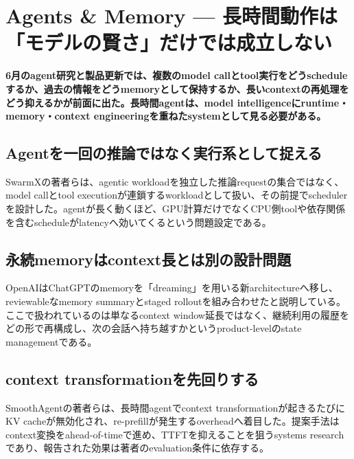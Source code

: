 \section{Agents \& Memory — 長時間動作は「モデルの賢さ」だけでは成立しない}
\noindent\textbf{6月のagent研究と製品更新では、複数のmodel callとtool実行をどうscheduleするか、過去の情報をどうmemoryとして保持するか、長いcontextの再処理をどう抑えるかが前面に出た。長時間agentは、model intelligenceにruntime・memory・context engineeringを重ねたsystemとして見る必要がある。}\autocite{src-80f8b4d899ff,src-c3ab33c62226,src-e8d9fd84bddc}

\subsection{Agentを一回の推論ではなく実行系として捉える}

SwarmXの著者らは、agentic workloadを独立した推論requestの集合ではなく、model callとtool executionが連鎖するworkloadとして扱い、その前提でschedulerを設計した。agentが長く動くほど、GPU計算だけでなくCPU側toolや依存関係を含むscheduleがlatencyへ効いてくるという問題設定である。\autocite{src-e8d9fd84bddc}


\subsection{永続memoryはcontext長とは別の設計問題}

OpenAIはChatGPTのmemoryを「dreaming」を用いる新architectureへ移し、reviewableなmemory summaryとstaged rolloutを組み合わせたと説明している。ここで扱われているのは単なるcontext window延長ではなく、継続利用の履歴をどの形で再構成し、次の会話へ持ち越すかというproduct-levelのstate managementである。\autocite{src-c3ab33c62226}


\subsection{context transformationを先回りする}

SmoothAgentの著者らは、長時間agentでcontext transformationが起きるたびにKV cacheが無効化され、re-prefillが発生するoverheadへ着目した。提案手法はcontext変換をahead-of-timeで進め、TTFTを抑えることを狙うsystems researchであり、報告された効果は著者のevaluation条件に依存する。\autocite{src-80f8b4d899ff}


